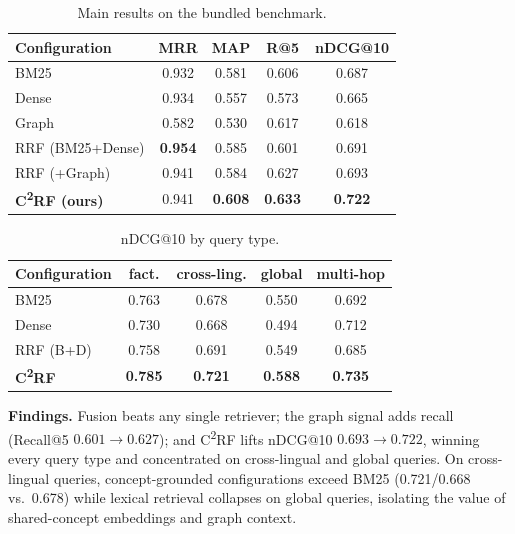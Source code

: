 \documentclass[10pt,twocolumn]{article}
\begin{document}
\begin{table}[t]
\centering\small
\caption{Main results on the bundled benchmark.}
\begin{tabular}{lcccc}
\toprule
Configuration & MRR & MAP & R@5 & nDCG@10 \\
\midrule
BM25 & 0.932 & 0.581 & 0.606 & 0.687 \\
Dense & 0.934 & 0.557 & 0.573 & 0.665 \\
Graph & 0.582 & 0.530 & 0.617 & 0.618 \\
RRF (BM25+Dense) & \textbf{0.954} & 0.585 & 0.601 & 0.691 \\
RRF (+Graph) & 0.941 & 0.584 & 0.627 & 0.693 \\
\textbf{C\textsuperscript{2}RF (ours)} & 0.941 & \textbf{0.608} & \textbf{0.633} & \textbf{0.722} \\
\bottomrule
\end{tabular}
\end{table}

\begin{table}[t]
\centering\small
\caption{nDCG@10 by query type.}
\begin{tabular}{lcccc}
\toprule
Configuration & fact. & cross-ling. & global & multi-hop \\
\midrule
BM25 & 0.763 & 0.678 & 0.550 & 0.692 \\
Dense & 0.730 & 0.668 & 0.494 & 0.712 \\
RRF (B+D) & 0.758 & 0.691 & 0.549 & 0.685 \\
\textbf{C\textsuperscript{2}RF} & \textbf{0.785} & \textbf{0.721} & \textbf{0.588} & \textbf{0.735} \\
\bottomrule
\end{tabular}
\end{table}

\textbf{Findings.} Fusion beats any single retriever; the graph signal adds recall (Recall@5
$0.601\!\to\!0.627$); and C\textsuperscript{2}RF lifts nDCG@10 $0.693\!\to\!0.722$, winning every query
type and concentrated on cross-lingual and global queries. On cross-lingual queries, concept-grounded
configurations exceed BM25 (0.721/0.668 vs.\ 0.678) while lexical retrieval collapses on global queries,
isolating the value of shared-concept embeddings and graph context.
\end{document}

